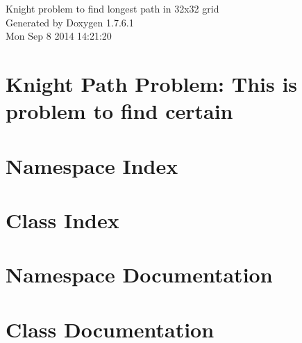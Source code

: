 \documentclass[a4paper]{book}
\begin{document}
\hypersetup{pageanchor=false,citecolor=blue}
\begin{titlepage}
\vspace*{7cm}
\begin{center}
{\Large \-Knight problem to find longest path in 32x32 grid }\\
\vspace*{1cm}
{\large \-Generated by Doxygen 1.7.6.1}\\
\vspace*{0.5cm}
{\small Mon Sep 8 2014 14:21:20}\\
\end{center}
\end{titlepage}
\clearemptydoublepage
{}
\tableofcontents
\clearemptydoublepage
{}
\hypersetup{pageanchor=true,citecolor=blue}
\chapter{\-Knight \-Path \-Problem\-: \-This is problem to find certain}
\label{index}\hypertarget{index}{}
\chapter{\-Namespace \-Index}

\chapter{\-Class \-Index}

\chapter{\-Namespace \-Documentation}

\chapter{\-Class \-Documentation}













\printindex
\end{document}
